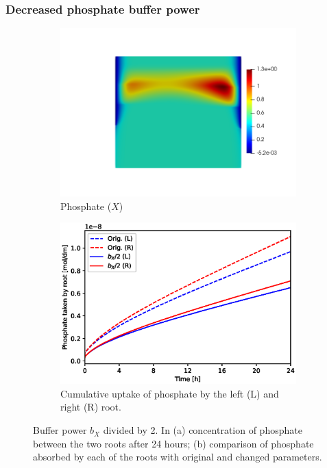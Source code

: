 \documentclass[11pt]{article}
\begin{document}
\FloatBarrier
\subsubsection{Decreased phosphate buffer power}
\begin{figure}[!htb]
\centering
\begin{subfigure}[t]{0.45\textwidth}
    \includegraphics[trim= 100 100 60 100,width=\textwidth]{Figures/X_bXdivby2.png}
    \caption{Phosphate ($X$)}
\end{subfigure}
\qquad
\begin{subfigure}[t]{0.45\textwidth}
    \includegraphics[width=\textwidth]{Figures/bxdivby2.eps}
    \caption{Cumulative uptake of phosphate by the left (L) and right (R) root.}
\end{subfigure}

\caption{Buffer power $b_X$ divided by 2. In (a) concentration of phosphate between the two roots after 24 hours; (b) comparison of phosphate absorbed by each of the roots with original and changed parameters.}
\end{figure}
\end{document}
